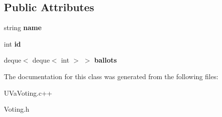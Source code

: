 \subsection*{Public Attributes}
\begin{DoxyCompactItemize}
\item 
\hypertarget{classcandidate_a1f1b1e89d8b9eb46fb434fbda193f15d}{string {\bfseries name}}\label{classcandidate_a1f1b1e89d8b9eb46fb434fbda193f15d}

\item 
\hypertarget{classcandidate_aa4d4295af21c1e74fde9e103271e7cde}{int {\bfseries id}}\label{classcandidate_aa4d4295af21c1e74fde9e103271e7cde}

\item 
\hypertarget{classcandidate_a925678448c6bcc5d3ba71569099afb00}{deque$<$ deque$<$ int $>$ $>$ {\bfseries ballots}}\label{classcandidate_a925678448c6bcc5d3ba71569099afb00}

\end{DoxyCompactItemize}


The documentation for this class was generated from the following files\-:\begin{DoxyCompactItemize}
\item 
U\-Va\-Voting.\-c++\item 
Voting.\-h\end{DoxyCompactItemize}
